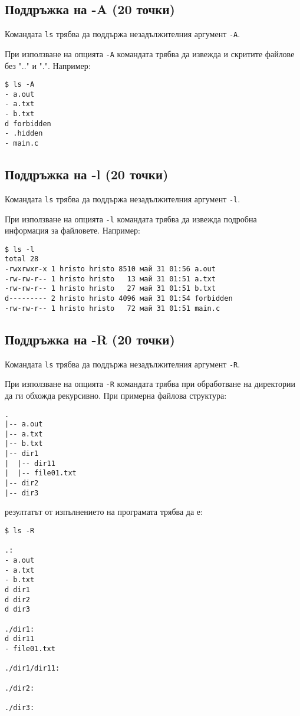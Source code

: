 \documentclass[a4paper,10pt]{article}
\begin{document}
\subsection{Поддръжка на {\ttfamily -A} (20 точки)}
Командата \lstinline{ls} трябва да поддържа незадължителния аргумент \lstinline{-A}.

При използване на опцията \lstinline{-A} командата трябва да извежда и скритите файлове без ".." и ".". Например:
\begin{verbatim}
$ ls -A
- a.out
- a.txt
- b.txt
d forbidden
- .hidden
- main.c
\end{verbatim}

\subsection{Поддръжка на {\ttfamily -l} (20 точки)}
Командата \lstinline{ls} трябва да поддържа незадължителния аргумент \lstinline{-l}.

При използване на опцията \lstinline{-l} командата трябва да извежда подробна информация за файловете. Например:
\begin{verbatim}
$ ls -l
total 28
-rwxrwxr-x 1 hristo hristo 8510 май 31 01:56 a.out
-rw-rw-r-- 1 hristo hristo   13 май 31 01:51 a.txt
-rw-rw-r-- 1 hristo hristo   27 май 31 01:51 b.txt
d--------- 2 hristo hristo 4096 май 31 01:54 forbidden
-rw-rw-r-- 1 hristo hristo   72 май 31 01:51 main.c
\end{verbatim}

\subsection{Поддръжка на {\ttfamily -R} (20 точки)}
Командата \lstinline{ls} трябва да поддържа незадължителния аргумент \lstinline{-R}.

При използване на опцията \lstinline{-R} командата трябва при обработване на директории да ги обхожда рекурсивно. При примерна файлова структура:
\begin{verbatim}
.
|-- a.out
|-- a.txt
|-- b.txt
|-- dir1
|  |-- dir11
|  |-- file01.txt
|-- dir2
|-- dir3
\end{verbatim}
резултатът от изпълнението на програмата трябва да е:
\begin{verbatim}
$ ls -R

.:
- a.out
- a.txt
- b.txt
d dir1
d dir2
d dir3

./dir1:
d dir11
- file01.txt

./dir1/dir11:

./dir2:

./dir3:

\end{verbatim}
\end{document}

